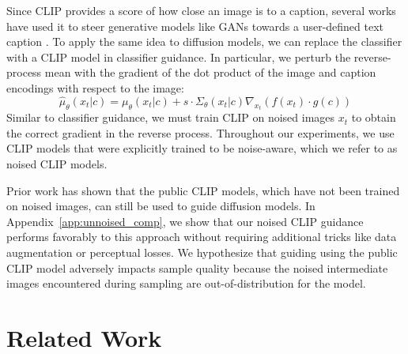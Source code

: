 \documentclass{article}
\begin{document}


Since CLIP provides a score of how close an image is to a caption, several works have used it to steer generative models like GANs towards a user-defined text caption \cite{clipglass,styleclip,bigsleep,stylegannada}. To apply the same idea to diffusion models, we can replace the classifier with a CLIP model in classifier guidance. In particular, we perturb the reverse-process mean with the gradient of the dot product of the image and caption encodings with respect to the image:
$$\hat{\mu}_{\theta}(x_t|c) = \mu_{\theta}(x_t|c) + s \cdot \Sigma_{\theta}(x_t|c) \nabla_{x_t} \left(f(x_t) \cdot g(c) \right)$$
Similar to classifier guidance, we must train CLIP on noised images $x_t$ to obtain the correct gradient in the reverse process. Throughout our experiments, we use CLIP models that were explicitly trained to be noise-aware, which we refer to as noised CLIP models.

Prior work \citet{clipdiff,secondarymodelmethod} has shown that the public CLIP models, which have not been trained on noised images, can still be used to guide diffusion models. In Appendix~\ref{app:unnoised_comp}, we show that our noised CLIP guidance performs favorably to this approach without requiring additional tricks like data augmentation or perceptual losses. We hypothesize that guiding using the public CLIP model adversely impacts sample quality because the noised intermediate images encountered during sampling are out-of-distribution for the model.

\section{Related Work}
\label{sec:related_work}
\end{document}
